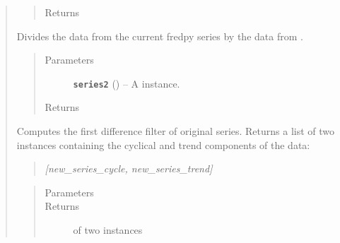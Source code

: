 \documentclass[letterpaper,10pt,openany,oneside]{sphinxmanual}
\begin{document}
\begin{fulllineitems}
\begin{quote}
\begin{fulllineitems}
\begin{quote}
\begin{description}
\item[{Returns}] \leavevmode
{\hyperref[series_class:fredpy.series]{}}

\end{description}\end{quote}

\end{fulllineitems}


\begin{fulllineitems}
\label{series_class:fredpy.series.divide}
Divides the data from the current fredpy series by the data from .
\begin{quote}\begin{description}
\item[{Parameters}] \leavevmode
\textbf{\texttt{series2}} ({\hyperref[series_class:fredpy.series]{}}) -- A  instance.

\item[{Returns}] \leavevmode
{\hyperref[series_class:fredpy.series]{}}

\end{description}\end{quote}

\end{fulllineitems}


\begin{fulllineitems}
\label{series_class:fredpy.series.firstdiff}
Computes the first difference filter of original series. Returns a list of two {\hyperref[series_class:fredpy.series]{}} instances containing the cyclical and trend components of the data:
\begin{quote}

\emph{{[}new\_series\_cycle, new\_series\_trend{]}}
\end{quote}
\begin{quote}\begin{description}
\item[{Parameters}] \leavevmode
\item[{Returns}] \leavevmode
\href{https://docs.python.org/library/functions.html\#list}{} of two {\hyperref[series_class:fredpy.series]{}} instances


\end{description}
\end{quote}
\end{fulllineitems}
\end{quote}
\end{fulllineitems}
\end{document}

